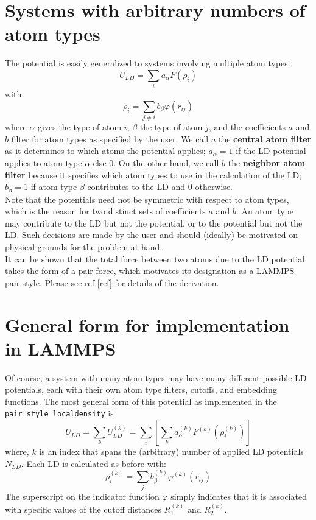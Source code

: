 \documentclass[10pt]{article}
\begin{document}
\section*{Systems with arbitrary numbers of atom types}
The potential is easily generalized to systems involving multiple atom types:
%
\begin{equation*}
U_{LD} = \sum_i a_\alpha F(\rho_i)
\end{equation*}
%
with
%
\begin{equation*}
\rho_i = \sum_{j \neq i} b_\beta \varphi(r_{ij})
\end{equation*}
%
where $\alpha$ gives the type of atom $i$, $\beta$ the type of atom $j$, and the coefficients $a$ and $b$ filter for atom types as specified by the user. We call $a$ the \textbf{central atom filter} as it determines to which atoms the potential applies; $a_\alpha = 1$ if the LD potential applies to atom type $\alpha$ else 0. On the other hand, we call $b$ the \textbf{neighbor atom filter} because it specifies which atom types to use in the calculation of the LD; $b_\beta = 1$ if atom type $\beta$ contributes to the LD and 0 otherwise.\\

\noindent Note that the potentials need not be symmetric with respect to atom types, which is the reason for two distinct sets of coefficients $a$ and $b$. An atom type may contribute to the LD but not the potential, or to the potential but not the LD. Such decisions are made by the user and should (ideally) be motivated on physical grounds for the problem at hand.\\

\noindent It can be shown that the total force between two atoms due to the LD potential takes the form of a pair force, which motivates its designation as a LAMMPS pair style. Please see ref [ref] for details of the derivation. 
%
%
%
\section*{General form for implementation in LAMMPS}
Of course, a system with many atom types may have many different possible LD potentials, each with their own atom type filters, cutoffs, and embedding functions. The most general form of this potential as implemented in the \texttt{pair\_style localdensity} is
%
\begin{equation*}
U_{LD} = \sum_k U_{LD}^{(k)} = \sum_i \left[ \sum_k a_\alpha^{(k)} F^{(k)} \left(\rho_i^{(k)}\right) \right] 
\end{equation*}
%
where, $k$ is an index that spans the (arbitrary) number of applied LD potentials $N_{LD}$. Each LD is calculated as before with:
%
\begin{equation*}
\rho_i^{(k)} = \sum_j b_\beta^{(k)} \varphi^{(k)} (r_{ij})
\end{equation*}
%
The superscript on the indicator function $\varphi$ simply indicates that it is associated with specific values of the cutoff distances $R_1^{(k)}$ and $R_2^{(k)}$.\\
\end{document}
